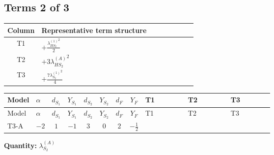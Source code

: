 \documentclass[8pt]{article}
\begin{document}
\begin{landscape}
\subsection*{Terms 2 of 3}
\begin{center}
\begin{tabular}{@{}c >{\raggedright\arraybackslash}p{0.82\linewidth}@{}}
\toprule
Column & Representative term structure \\
\midrule
T1 & \(\displaystyle +\frac{{\lambda_{HS_2}^{(1)}}^2}{2}\) \\
\midrule
T2 & \(\displaystyle +3 {\lambda_{HS_2}^{(A)}}^2\) \\
\midrule
T3 & \(\displaystyle +\frac{7 {\lambda_{S_2}^{(1)}}^2}{4}\) \\
\midrule
\bottomrule
\end{tabular}
\end{center}
\smallskip
\tiny
\begin{longtable}{@{}llcccccc >{\raggedright\arraybackslash}p{0.21\linewidth} >{\raggedright\arraybackslash}p{0.21\linewidth} >{\raggedright\arraybackslash}p{0.21\linewidth}@{}}
\toprule
Model & $\alpha$ & $d_{S_1}$ & $Y_{S_1}$ & $d_{S_2}$ & $Y_{S_2}$ & $d_F$ & $Y_F$ & T1 & T2 & T3 \\
\midrule
\endfirsthead
\toprule
Model & $\alpha$ & $d_{S_1}$ & $Y_{S_1}$ & $d_{S_2}$ & $Y_{S_2}$ & $d_F$ & $Y_F$ & T1 & T2 & T3 \\
\midrule
\endhead
T3-A & $-2$ & $1$ & $-1$ & $3$ & $0$ & $2$ & $-\frac{1}{2}$ & \scriptsize\adjustbox{max width=\linewidth}{$\begin{gathered} +\frac{{\lambda_{HS_2}^{(1)}}^2}{2}\end{gathered}$} & \scriptsize\adjustbox{max width=\linewidth}{$\begin{gathered} +3 {\lambda_{HS_2}^{(A)}}^2\end{gathered}$} & \scriptsize\adjustbox{max width=\linewidth}{$\begin{gathered} +\frac{7 {\lambda_{S_2}^{(1)}}^2}{4}\end{gathered}$} \\
\midrule
\bottomrule
\end{longtable}
\clearpage
\noindent\textbf{Quantity: }$\lambda_{S_2}^{(A)}$\par\smallskip

\end{landscape}
\end{document}
